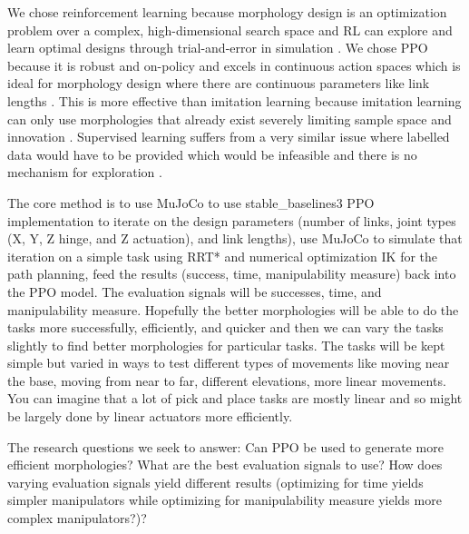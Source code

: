 \documentclass[conference]{IEEEtran}
\begin{document}
We chose reinforcement learning because morphology design is an optimization problem over a complex, high-dimensional search space and RL can explore and learn optimal designs through trial-and-error in simulation \cite{sutton1988learning}.
We chose PPO because it is robust and on-policy and excels in continuous action spaces which is ideal for morphology design where there are continuous parameters like link lengths \cite{schulman2017proximal}.
This is more effective than imitation learning because imitation learning can only use morphologies that already exist severely limiting sample space and innovation \cite{delgado2022robotics}.
Supervised learning suffers from a very similar issue where labelled data would have to be provided which would be infeasible and there is no mechanism for exploration \cite{kober2013reinforcement}.

The core method is to use MuJoCo to use stable\_baselines3 PPO implementation to iterate on the design parameters (number of links, joint types (X, Y, Z hinge, and Z actuation), and link lengths), use MuJoCo to simulate that iteration on a simple task using RRT* and numerical optimization IK for the path planning, feed the results (success, time, manipulability measure) back into the PPO model.
The evaluation signals will be successes, time, and manipulability measure.
Hopefully the better morphologies will be able to do the tasks more successfully, efficiently, and quicker and then we can vary the tasks slightly to find better morphologies for particular tasks.
The tasks will be kept simple but varied in ways to test different types of movements like moving near the base, moving from near to far, different elevations, more linear movements.
You can imagine that a lot of pick and place tasks are mostly linear and so might be largely done by linear actuators more efficiently.

The research questions we seek to answer: Can PPO be used to generate more efficient morphologies? What are the best evaluation signals to use? How does varying evaluation signals yield different results (optimizing for time yields simpler manipulators while optimizing for manipulability measure yields more complex manipulators?)?
\end{document}

